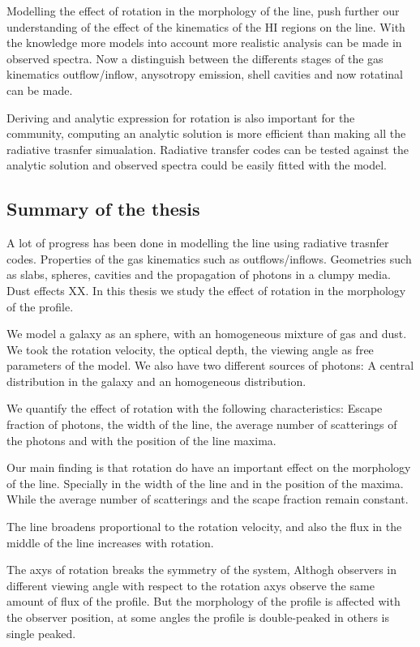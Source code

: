 Modelling the effect of rotation in the morphology of the \ly line, push
further our understanding of the effect of the kinematics of the HI regions
on the line. With the knowledge more models into account more 
realistic analysis can be made in observed \ly spectra. 
Now a distinguish between the differents stages of the gas kinematics
 outflow/inflow, anysotropy \ly emission, shell cavities and now
 rotatinal can be made.

Deriving and analytic expression for rotation is also important for
the community, computing an analytic solution is more efficient than
making all the radiative trasnfer simualation. Radiative transfer codes
can be tested against the analytic solution and observed spectra could
be easily fitted  with the model. 

\subsection{Summary of the thesis}

A lot of progress has been done in modelling the \ly line using radiative
trasnfer codes. Properties of the gas kinematics such as outflows/inflows. 
Geometries such as slabs, spheres, cavities and the propagation of \ly photons
in a clumpy media. Dust effects XX. In this thesis we study the effect 
of rotation in the morphology of the \ly profile.  

We model a galaxy as an sphere, with an homogeneous mixture of gas and dust. 
We took the rotation velocity, the optical depth, the viewing angle as free
parameters of the model. We also have two different sources of \ly photons:
A central distribution in the galaxy and an homogeneous distribution. 

We quantify the effect of rotation with the following characteristics: 
Escape fraction of \ly photons, the width of the \ly line, the average number
of scatterings of the \ly photons and with the position of the \ly line maxima.

Our main finding is that rotation do have an important effect on the morphology 
of the \ly line. Specially in the width of the line and in the position of the 
maxima. While the average number of scatterings  and the scape
fraction remain constant.

The line broadens proportional to the rotation velocity, and also the flux in 
the middle of the line increases with rotation.

The axys of rotation breaks the symmetry of the system, Althogh 
observers in different viewing angle with respect to the rotation axys
observe the same amount of flux of the \ly profile. But the morphology
of the profile is affected with the observer position, at some angles
the profile is double-peaked in others is single peaked. 
 
